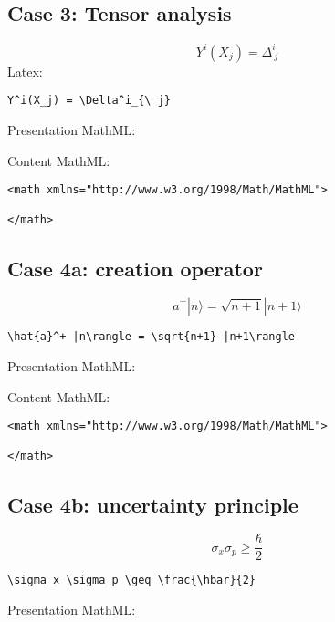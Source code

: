 \subsection{Case 3: Tensor analysis}
\begin{equation}
Y^i(X_j) = \Delta^i_{\ j}
\label{eq:tensor_analysis_case3}
\end{equation}
Latex: 
\begin{verbatim}
Y^i(X_j) = \Delta^i_{\ j}
\end{verbatim}

Presentation MathML:


Content MathML:
\begin{verbatim}
<math xmlns="http://www.w3.org/1998/Math/MathML">

</math>
\end{verbatim}


\subsection{Case 4a: creation operator}
\begin{equation}
\hat{a}^+ |n\rangle = \sqrt{n+1} |n+1\rangle
\label{eq:creation_operator_case4a}
\end{equation}

\begin{verbatim}
\hat{a}^+ |n\rangle = \sqrt{n+1} |n+1\rangle
\end{verbatim}

Presentation MathML:


Content MathML:
\begin{verbatim}
<math xmlns="http://www.w3.org/1998/Math/MathML">

</math>
\end{verbatim}

\subsection{Case 4b: uncertainty principle}
\begin{equation}
\sigma_x \sigma_p \geq \frac{\hbar}{2}
\label{eq:uncertainty_principle_case4b}
\end{equation}

\begin{verbatim}
\sigma_x \sigma_p \geq \frac{\hbar}{2}
\end{verbatim}

Presentation MathML:


